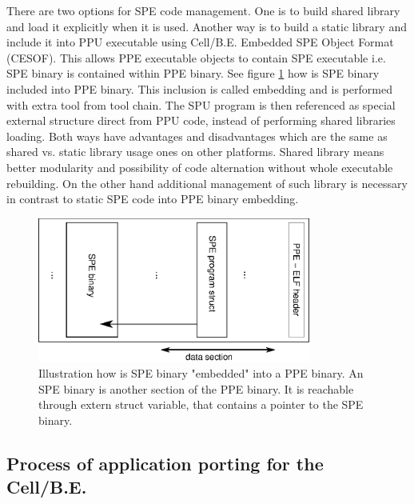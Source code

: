 \par
There are two options for SPE code management.
One is to build shared library and load it explicitly when it is used.
Another way is to build a static library and include it into PPU executable using Cell/B.E. Embedded SPE Object Format (CESOF).
This allows PPE executable objects to contain SPE executable i.e. SPE binary is contained within PPE binary.
See figure \ref{fg:SPEEmbedding} how is SPE binary included into PPE binary.
This inclusion is called embedding and is performed with extra tool from tool chain.
The SPU program is then referenced as special external structure direct from PPU code, instead of performing shared libraries loading.
Both ways have advantages and disadvantages which are the same as shared vs. static library usage ones on other platforms.
Shared library means better modularity and possibility of code alternation without whole executable rebuilding.
On the other hand additional management of such library is necessary in contrast to static SPE code into PPE binary embedding.


\begin{figure}
    \centering
    \includegraphics[width=0.8\textwidth]{data/SPEEmbedding}
    \caption[SPE binary embedding]{Illustration how is SPE binary "embedded" into a PPE binary.
An SPE binary is another section of the PPE binary.
It is reachable through extern struct variable, that contains a pointer to the SPE binary.}
    \label{fg:SPEEmbedding}
\end{figure}



\subsection {Process of application porting for the Cell/B.E.}
\label{sect:portingProcess}

